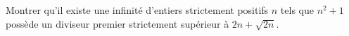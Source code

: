 Montrer qu'il existe une infinité d'entiers strictement positifs $n$ tels que $n^2 + 1$ possède un diviseur
premier strictement supérieur à $2n + \sqrt{2n}$.
